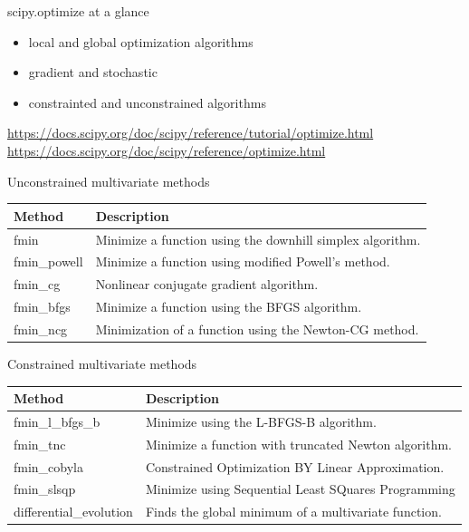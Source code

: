 \documentclass[10pt]{beamer}
\begin{document}
\begin{frame}{scipy.optimize at a glance}
\begin{itemize}
\item local and global optimization algorithms
\item gradient and stochastic
\item constrainted and unconstrained algorithms 
\end{itemize}
\url{https://docs.scipy.org/doc/scipy/reference/tutorial/optimize.html}
\url{https://docs.scipy.org/doc/scipy/reference/optimize.html}
\end{frame}

\begin{frame}{Unconstrained multivariate methods}
\begin{table}
\begin{tabular}{ll}
\textbf{Method} & \textbf{Description}  \\
\hline
fmin & Minimize a function using the downhill simplex algorithm.\\
fmin\_powell & Minimize a function using modified Powell’s method.\\
fmin\_cg & Nonlinear conjugate gradient algorithm.\\
fmin\_bfgs & Minimize a function using the BFGS algorithm.\\
fmin\_ncg &	Minimization of a function using the Newton-CG method.\\
\end{tabular}
\end{table}
\end{frame}

\begin{frame}{Constrained multivariate methods}
\begin{table}
\begin{tabular}{ll}
\textbf{Method} & \textbf{Description}  \\
\hline
fmin\_l\_bfgs\_b &	Minimize using the L-BFGS-B algorithm.\\
fmin\_tnc & 	Minimize a function with truncated Newton algorithm.\\
fmin\_cobyla &  	Constrained Optimization BY Linear Approximation.\\
fmin\_slsqp &  	Minimize using Sequential Least SQuares Programming\\
differential\_evolution & 	Finds the global minimum of a multivariate function.\\
\end{tabular}
\end{table}
\end{frame}
\end{document}

